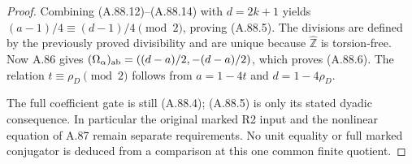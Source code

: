 \begin{proof}
Combining (A.88.12)--(A.88.14) with \(d=2k+1\) yields
\((a-1)/4\equiv(d-1)/4\pmod2\), proving (A.88.5).
The divisions are defined by the previously proved divisibility
and are unique because \(\widehat{\mathbb Z}\) is torsion-free.
Now A.86 gives
\((\Omega_\alpha)_{\rm ab}=((d-a)/2,-(d-a)/2)\), which proves
(A.88.6). The relation \(t\equiv\rho_D\pmod2\) follows from
\(a=1-4t\) and \(d=1-4\rho_D\).

The full coefficient gate is still (A.88.4); (A.88.5) is only
its stated dyadic consequence. In particular the original marked
R2 input and the nonlinear equation of A.87 remain separate
requirements. No unit equality or full marked conjugator is
deduced from a comparison at this one common finite quotient.
\end{proof}
